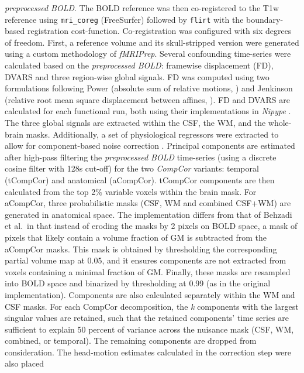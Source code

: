 \documentclass[
]{article}
\begin{document}
\begin{description}
\emph{preprocessed BOLD}. The BOLD reference was then co-registered to
the T1w reference using \texttt{mri\_coreg} (FreeSurfer) followed by
\texttt{flirt} \citep[FSL 6.0.5.1:57b01774,][]{flirt} with the
boundary-based registration \citep{bbr} cost-function. Co-registration
was configured with six degrees of freedom. First, a reference volume
and its skull-stripped version were generated using a custom methodology
of \emph{fMRIPrep}. Several confounding time-series were calculated
based on the \emph{preprocessed BOLD}: framewise displacement (FD),
DVARS and three region-wise global signals. FD was computed using two
formulations following Power (absolute sum of relative motions,
\citet{power_fd_dvars}) and Jenkinson (relative root mean square
displacement between affines, \citet{mcflirt}). FD and DVARS are
calculated for each functional run, both using their implementations in
\emph{Nipype} \citep[following the definitions by][]{power_fd_dvars}.
The three global signals are extracted within the CSF, the WM, and the
whole-brain masks. Additionally, a set of physiological regressors were
extracted to allow for component-based noise correction
\citep[\emph{CompCor},][]{compcor}. Principal components are estimated
after high-pass filtering the \emph{preprocessed BOLD} time-series
(using a discrete cosine filter with 128s cut-off) for the two
\emph{CompCor} variants: temporal (tCompCor) and anatomical (aCompCor).
tCompCor components are then calculated from the top 2\% variable voxels
within the brain mask. For aCompCor, three probabilistic masks (CSF, WM
and combined CSF+WM) are generated in anatomical space. The
implementation differs from that of Behzadi et al.~in that instead of
eroding the masks by 2 pixels on BOLD space, a mask of pixels that
likely contain a volume fraction of GM is subtracted from the aCompCor
masks. This mask is obtained by thresholding the corresponding partial
volume map at 0.05, and it ensures components are not extracted from
voxels containing a minimal fraction of GM. Finally, these masks are
resampled into BOLD space and binarized by thresholding at 0.99 (as in
the original implementation). Components are also calculated separately
within the WM and CSF masks. For each CompCor decomposition, the
\emph{k} components with the largest singular values are retained, such
that the retained components' time series are sufficient to explain 50
percent of variance across the nuisance mask (CSF, WM, combined, or
temporal). The remaining components are dropped from consideration. The
head-motion estimates calculated in the correction step were also placed

\end{description}
\end{document}
